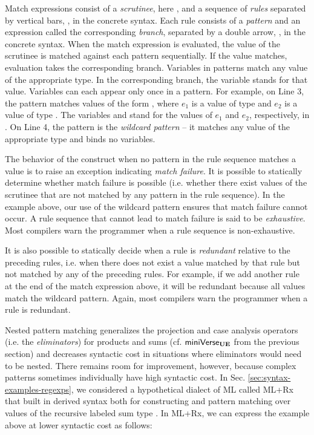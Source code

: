 Match expressions consist of a \emph{scrutinee}, here , and a sequence of \emph{rules} separated by vertical bars, \li{|}, in the concrete syntax. Each rule consists of a \emph{pattern} and an {expression} called the corresponding \emph{branch}, separated by a double arrow, \li{=>}, in the concrete syntax. When the {match} expression is evaluated, the value of the scrutinee is matched against each pattern sequentially. If the value matches, evaluation takes the corresponding branch. Variables in patterns match any value of the appropriate type. In the corresponding branch, the variable stands for that value. Variables can each appear only once in a pattern.  
For example, on Line 3, the pattern  matches values of the form , where $e_1$ is a value of type  and $e_2$ is a value of type . The variables  and  stand for the values of $e_1$ and $e_2$, respectively, in . On Line 4, the pattern \li{_} is the \emph{wildcard pattern} -- it matches any value of the appropriate type and binds no variables.

The behavior of the  construct when no pattern in the rule sequence matches a value is to raise an exception indicating \emph{match failure}. It is possible to statically determine whether match failure is possible (i.e. whether there exist values of the scrutinee that are not matched by any pattern in the rule sequence). In the example above, our use of the wildcard pattern ensures that match failure cannot occur. A rule sequence that cannot lead to match failure is said to be \emph{exhaustive}. Most compilers warn the programmer when a rule sequence is non-exhaustive.

It is also possible to statically decide when a rule is \emph{redundant} relative to the preceding rules, i.e. when there does not exist a value matched by that rule but not matched by any of the preceding rules. For example, if we add  another rule at the end of the match expression above, it will be redundant because all values match the wildcard pattern. Again, most compilers warn the programmer when a rule is redundant.

Nested pattern matching generalizes the projection and case analysis operators (i.e. the \emph{eliminators}) for products and sums (cf. $\mathsf{miniVerse}_\textbf{UE}$ from the previous section) and decreases syntactic cost in situations where eliminators would need to be nested. There remains room for improvement, however, because complex patterns sometimes    individually have high syntactic cost. In Sec. \ref{sec:syntax-examples-regexps}, we considered a hypothetical dialect of ML called ML+Rx that built in derived syntax both for constructing and pattern matching over values of the recursive labeled sum type . In ML+Rx, we can express the example above at lower syntactic cost as follows:

